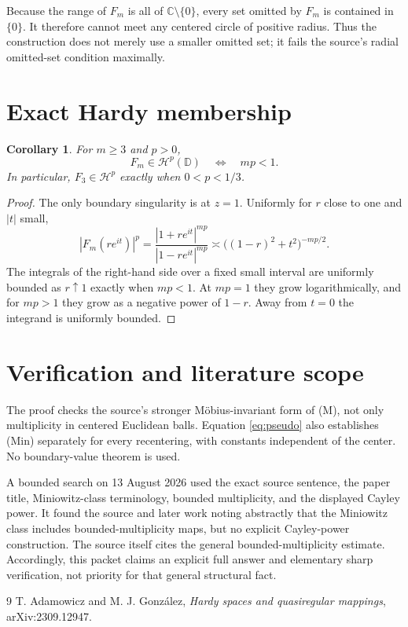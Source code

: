 \documentclass[10pt]{article}
\newtheorem{corollary}[theorem]{Corollary}
\newcommand{\D}{\mathbb D}
\newcommand{\C}{\mathbb C}
\begin{document}
Because the range of $F_m$ is all of $\C\setminus\{0\}$, every set omitted by
$F_m$ is contained in $\{0\}$.  It therefore cannot meet any centered circle
of positive radius.  Thus the construction does not merely use a smaller
omitted set; it fails the source's radial omitted-set condition maximally.

\section{Exact Hardy membership}

\begin{corollary}\label{cor:hardy}
For $m\ge3$ and $p>0$,
\[
 F_m\in\mathcal H^p(\D)\quad\Longleftrightarrow\quad mp<1.
\]
In particular, $F_3\in\mathcal H^p$ exactly when $0<p<1/3$.
\end{corollary}

\begin{proof}
The only boundary singularity is at $z=1$.  Uniformly for $r$ close to one
and $|t|$ small,
\[
 |F_m(re^{it})|^p
 =\frac{|1+re^{it}|^{mp}}{|1-re^{it}|^{mp}}
 \asymp \bigl((1-r)^2+t^2\bigr)^{-mp/2}.
\]
The integrals of the right-hand side over a fixed small interval are
uniformly bounded as $r\uparrow1$ exactly when $mp<1$.  At $mp=1$ they grow
logarithmically, and for $mp>1$ they grow as a negative power of $1-r$.
Away from $t=0$ the integrand is uniformly bounded.
\end{proof}

\section{Verification and literature scope}

The proof checks the source's stronger M\"obius-invariant form of (M), not
only multiplicity in centered Euclidean balls.  Equation \eqref{eq:pseudo}
also establishes (Min) separately for every recentering, with constants
independent of the center.  No boundary-value theorem is used.

A bounded search on 13 August 2026 used the exact source sentence, the paper
title, Miniowitz-class terminology, bounded multiplicity, and the displayed
Cayley power.  It found the source and later work noting abstractly that the
Miniowitz class includes bounded-multiplicity maps, but no explicit
Cayley-power construction.  The source itself cites the general
bounded-multiplicity estimate.  Accordingly, this packet claims an explicit
full answer and elementary sharp verification, not priority for that general
structural fact.

\begin{thebibliography}{9}
T. Adamowicz and M. J. Gonz\'alez,
\emph{Hardy spaces and quasiregular mappings}, arXiv:2309.12947.
\end{thebibliography}
\end{document}
